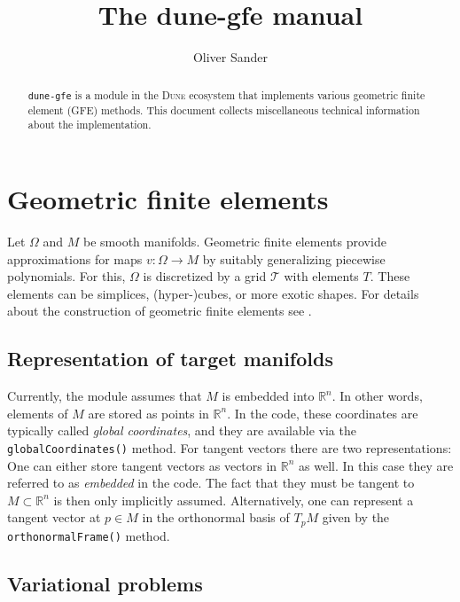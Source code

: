 \documentclass[a4paper]{article}
\title{The dune-gfe manual}
\author{Oliver Sander}
\newcommand{\cpp}[1]{\lstinline[basicstyle=\ttfamily]!#1!}
\newcommand{\dunemodule}[1]{\texttt{#1}}
\newcommand{\R}{\mathbb R}
\begin{document}
\maketitle

\begin{abstract}
 \dunemodule{dune-gfe} is a module in the \textsc{Dune} ecosystem that implements
 various geometric finite element (GFE) methods.
 This document collects miscellaneous technical information about the implementation.
\end{abstract}

\section{Geometric finite elements}

Let $\Omega$ and $M$ be smooth manifolds.  Geometric finite elements provide approximations for maps
$v : \Omega \to M$ by suitably generalizing piecewise polynomials.  For this,
$\Omega$ is discretized by a grid $\mathcal{T}$ with elements $T$.
These elements can be simplices, (hyper-)cubes, or more exotic shapes.
For details about the construction of geometric finite elements see
\cite{sander:2010,sander:2012,sander:2015,grohs_hardering_sander_sprecher:2019,hardering_sander:2020}.

\subsection{Representation of target manifolds}
\label{sec:representation_of_manifolds}

Currently, the module assumes that $M$ is embedded into $\R^n$.  In other words,
elements of $M$ are stored as points in $\R^n$. In the code, these coordinates
are typically called \emph{global coordinates}, and they are available via the
\cpp{globalCoordinates()} method. For tangent vectors there are two representations:
One can either store tangent vectors as vectors in $\R^n$ as well.  In this case
they are referred to as \emph{embedded} in the code. The fact that they must be
tangent to $M \subset \R^n$ is then only implicitly assumed.  Alternatively,
one can represent a tangent vector at $p \in M$ in the orthonormal basis of $T_p M$
given by the \cpp{orthonormalFrame()} method.


\subsection{Variational problems}
\end{document}
